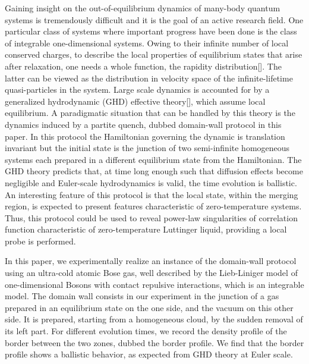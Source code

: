 \documentclass[submission, Phys]{SciPost}
\begin{document}
Gaining insight on the out-of-equilibrium dynamics of many-body quantum systems is tremendously difficult and it is the goal of an active research field.  
One particular class of systems where important progress have been done is the class of integrable one-dimensional systems. 
Owing to their infinite number of local conserved charges, to describe the local properties of equilibrium states that arise after relaxation, one needs a  whole function, the rapidity distribution[]. 
The latter can be viewed as the distribution in velocity space 
of the infinite-lifetime quasi-particles in the system. Large scale dynamics is 
accounted for by a generalized hydrodynamic (GHD) effective theory[], which 
assume local equilibrium.
A paradigmatic situation that can be handled by  this theory is the dynamics 
induced by a partite quench\cite{bertini_transport_2016,castro-alvaredo_emergent_2016}, dubbed  domain-wall protocol in this paper. In this protocol the Hamiltonian governing the  dynamic is translation invariant but the initial state is the junction of two semi-infinite 
homogeneous systems each prepared in a different equilibrium state from the Hamiltonian. The GHD theory predicts that, at time long enough such that diffusion effects become negligible\cite{de_nardis_diffusion_2019} and Euler-scale hydrodynamics is valid,  the time evolution is ballistic. %
An interesting feature of this protocol is that the local state, within the merging region, is expected to present features
characteristic of zero-temperature systems. Thus, this protocol could be used to reveal power-law singularities of correlation function characteristic of zero-temperature Luttinger liquid\cite{de_nardis_edge_2018}, providing a local  probe is performed. 

In this paper, we experimentally realize an instance of the domain-wall protocol
using an ultra-cold atomic Bose gas, well described by the Lieb-Liniger model of 
one-dimensional Bosons with contact repulsive interactions\cite{lieb_exact_1963,bouchoule_generalized_2022}, which is an integrable model. 
The domain wall consists in our experiment in the junction of a gas prepared in an equilibrium state on the one side, and the vacuum on this other side. It is prepared, starting from a homogeneous cloud, by the sudden removal of its left part. For different evolution times, we record the density profile of the border between the two zones, dubbed the border profile. We find that the border profile shows a ballistic behavior, as expected from GHD theory at Euler scale. 
\end{document}
